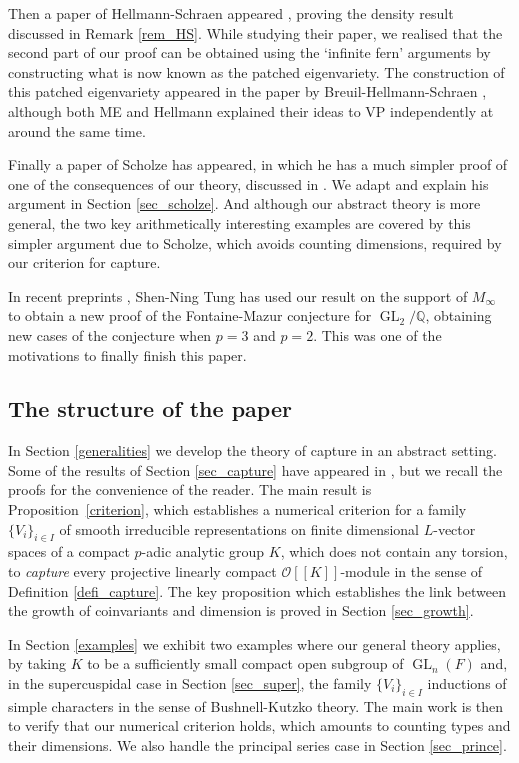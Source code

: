 \documentclass[11pt]{article}
\let\mathcal\mathscr
\theoremstyle{definition}
\DeclareMathOperator{\GL}{GL}
\newcommand{\br}[1]{[\![#1]\!]}
\newcommand{\QQ}{\mathbb Q}
\newcommand{\cO}{\mathcal{O}}
\begin{document}
Then a paper of Hellmann-Schraen appeared \cite{HS}, proving the density result
discussed in Remark \ref{rem_HS}. While studying their paper, we realised that the second part of our proof
can be obtained using the `infinite fern' arguments by constructing what is now known as the patched
eigenvariety. The construction of this patched eigenvariety appeared in the paper by
Breuil-Hellmann-Schraen \cite{BHS}, although both ME and Hellmann explained their ideas
to VP independently at around the same time.

Finally a paper of Scholze \cite{scholze} has appeared, in which he has a much simpler proof of one of the consequences of our theory, discussed in \cite[3.3.2]{matt_icm}. We adapt and explain his argument in Section \ref{sec_scholze}. And although our abstract theory is more general, the two key arithmetically interesting examples are covered by this simpler argument due to Scholze, which avoids counting dimensions, required by our criterion for capture.

In recent preprints \cite{shen-ning}, \cite{shen-ning2} Shen-Ning Tung has used our result on the support
of $M_{\infty}$ to obtain a new proof of the Fontaine-Mazur conjecture for $\GL_2/\QQ$,
obtaining new cases of the conjecture when $p=3$ and $p=2$. This was one of the motivations to finally finish this paper.

\subsection{The structure of the paper} In Section \ref{generalities} we develop the theory of capture in
an abstract setting. Some of the results of Section \ref{sec_capture} have appeared in \cite[\S 2.4]{CDP}, but
we recall the proofs for the convenience of the reader. The main result is \hbox{Proposition \ref{criterion}},
which establishes a numerical criterion for a family $\{V_i\}_{i\in I}$ of smooth irreducible representations on finite
dimensional $L$-vector spaces of a compact $p$-adic analytic group $K$, which does not contain any torsion, to \textit{capture} every projective linearly compact $\cO\br{K}$-module in the sense of
Definition \ref{defi_capture}. The key proposition which establishes the link between the
growth of coinvariants and dimension is proved in Section \ref{sec_growth}.

In Section \ref{examples} we exhibit two examples where our general theory applies, by taking $K$
to be a sufficiently small compact open subgroup of $\GL_n(F)$ and, in the supercuspidal case in Section \ref{sec_super}, the family $\{V_i\}_{i\in I}$ inductions of simple characters in the sense of Bushnell-Kutzko theory. The main
work is then to verify that our numerical criterion holds, which amounts to counting types and their dimensions. We also handle the principal series case in Section \ref{sec_prince}.
\end{document}

